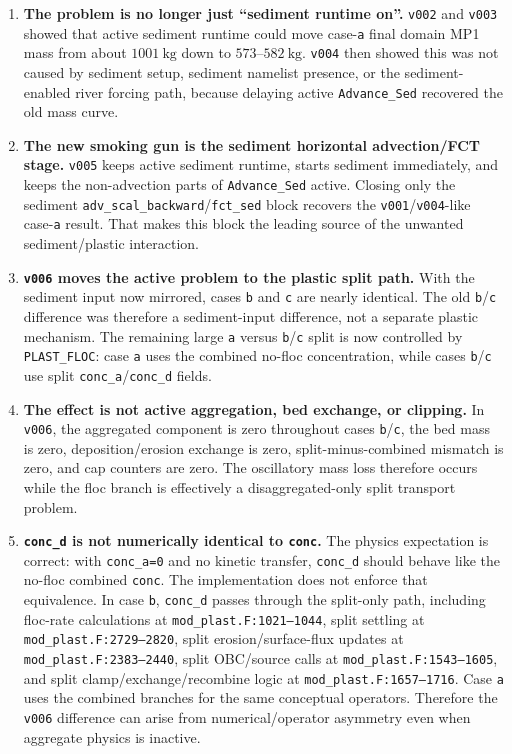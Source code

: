 \documentclass[11pt]{article}
\begin{document}
\begin{enumerate}
\item \textbf{The problem is no longer just ``sediment runtime on''.}
\texttt{v002} and \texttt{v003} showed that active sediment runtime could move
case-\texttt{a} final domain MP1 mass from about \(1001~\mathrm{kg}\) down to
\(573\)--\(582~\mathrm{kg}\).  \texttt{v004} then showed this was not caused by
sediment setup, sediment namelist presence, or the sediment-enabled river
forcing path, because delaying active \texttt{Advance\_Sed} recovered the old
mass curve.

\item \textbf{The new smoking gun is the sediment horizontal
advection/FCT stage.} \texttt{v005} keeps active sediment runtime, starts
sediment immediately, and keeps the non-advection parts of
\texttt{Advance\_Sed} active.  Closing only the sediment
\texttt{adv\_scal\_backward}/\texttt{fct\_sed} block recovers the
\texttt{v001}/\texttt{v004}-like case-\texttt{a} result.  That makes this block
the leading source of the unwanted sediment/plastic interaction.

\item \textbf{\texttt{v006} moves the active problem to the plastic split
path.} With the sediment input now mirrored, cases \texttt{b} and \texttt{c}
are nearly identical.  The old \texttt{b}/\texttt{c} difference was therefore a
sediment-input difference, not a separate plastic mechanism.  The remaining
large \texttt{a} versus \texttt{b}/\texttt{c} split is now controlled by
\texttt{PLAST\_FLOC}: case \texttt{a} uses the combined no-floc concentration,
while cases \texttt{b}/\texttt{c} use split \texttt{conc\_a}/\texttt{conc\_d}
fields.

\item \textbf{The effect is not active aggregation, bed exchange, or clipping.}
In \texttt{v006}, the aggregated component is zero throughout cases
\texttt{b}/\texttt{c}, the bed mass is zero, deposition/erosion exchange is
zero, split-minus-combined mismatch is zero, and cap counters are zero.  The
oscillatory mass loss therefore occurs while the floc branch is effectively a
disaggregated-only split transport problem.

\item \textbf{\texttt{conc\_d} is not numerically identical to \texttt{conc}.}
The physics expectation is correct: with \texttt{conc\_a=0} and no kinetic
transfer, \texttt{conc\_d} should behave like the no-floc combined
\texttt{conc}.  The implementation does not enforce that equivalence.  In
case \texttt{b}, \texttt{conc\_d} passes through the split-only path, including
floc-rate calculations at \texttt{mod\_plast.F:1021--1044}, split settling at
\texttt{mod\_plast.F:2729--2820}, split erosion/surface-flux updates at
\texttt{mod\_plast.F:2383--2440}, split OBC/source calls at
\texttt{mod\_plast.F:1543--1605}, and split clamp/exchange/recombine logic at
\texttt{mod\_plast.F:1657--1716}.  Case \texttt{a} uses the combined branches
for the same conceptual operators.  Therefore the \texttt{v006} difference can
arise from numerical/operator asymmetry even when aggregate physics is inactive.


\end{enumerate}
\end{document}
